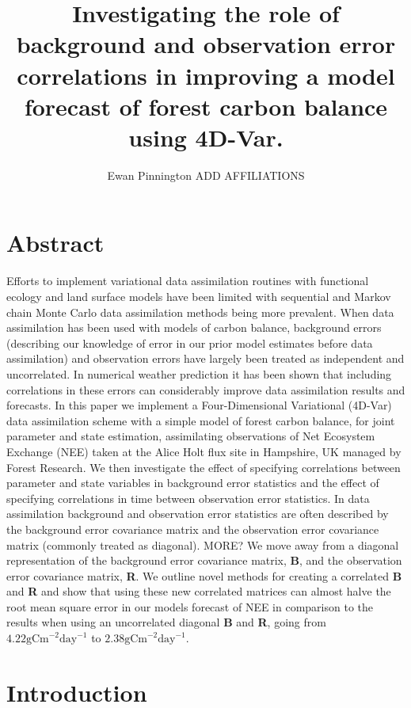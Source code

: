 \documentclass[11pt]{article}
\title{Investigating the role of background and observation error correlations in improving a model forecast of forest carbon balance using 4D-Var.}
\author{Ewan Pinnington ADD AFFILIATIONS}
\begin{document}
\maketitle

\section*{Abstract}

Efforts to implement variational data assimilation routines with functional ecology and land surface models have been limited with sequential and Markov chain Monte Carlo data assimilation methods being more prevalent. When data assimilation has been used with models of carbon balance, background errors (describing our knowledge of error in our prior model estimates before data assimilation) and observation errors have largely been treated as independent and uncorrelated. In numerical weather prediction it has been shown that including correlations in these errors can considerably improve data assimilation results and forecasts. In this paper we implement a Four-Dimensional Variational (4D-Var) data assimilation scheme with a simple model of forest carbon balance, for joint parameter and state estimation, assimilating observations of Net Ecosystem Exchange (NEE) taken at the Alice Holt flux site in Hampshire, UK managed by Forest Research. We then investigate the effect of specifying correlations between parameter and state variables in background error statistics and the effect of specifying correlations in time between observation error statistics. In data assimilation background and observation error statistics are often described by the background error covariance matrix and the observation error covariance matrix (commonly treated as diagonal). MORE? We move away from a diagonal representation of the background error covariance matrix, \textbf{B}, and the observation error covariance matrix, \textbf{R}. We outline novel methods for creating a correlated \textbf{B} and \textbf{R} and show that using these new correlated matrices can almost halve the root mean square error in our models forecast of NEE in comparison to the results when using an uncorrelated diagonal \textbf{B} and \textbf{R}, going from $4.22\text{gCm}^{-2}\text{day}^{-1}$ to $2.38\text{gCm}^{-2}\text{day}^{-1}$.      

\section{Introduction}
\end{document}
